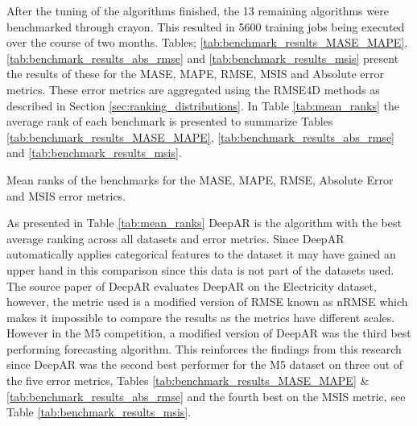 After the tuning of the algorithms finished,  the 13 remaining algorithms were benchmarked through crayon. This resulted in 5600 training jobs being executed over the course of two months. Tables; \ref{tab:benchmark_results_MASE_MAPE}, \ref{tab:benchmark_results_abs_rmse} and \ref{tab:benchmark_results_msis} present the results of these for the MASE, MAPE, RMSE, MSIS and Absolute error metrics. These error metrics are aggregated using the RMSE4D methods as described in Section \ref{sec:ranking_distributions}. In Table \ref{tab:mean_ranks} the average rank of each benchmark is presented to summarize Tables \ref{tab:benchmark_results_MASE_MAPE}, \ref{tab:benchmark_results_abs_rmse} and \ref{tab:benchmark_results_msis}.

\begin{table}[h]
  \centering
  \caption{Mean ranks of the benchmarks for the MASE, MAPE, RMSE, Absolute Error and MSIS error metrics.}
  \label{tab:mean_ranks}
\end{table}

As presented in Table \ref{tab:mean_ranks} DeepAR is the algorithm with the best average ranking across all datasets and error metrics. Since DeepAR automatically applies categorical features to the dataset it may have gained an upper hand in this comparison since this data is not part of the datasets used. The source paper of DeepAR evaluates DeepAR on the Electricity dataset, however, the metric used is a modified version of RMSE known as nRMSE which makes it impossible to compare the results as the metrics have different scales. However in the M5 competition, a modified version of DeepAR was the third best performing forecasting algorithm. This reinforces the findings from this research since DeepAR was the second best performer for the M5 dataset on three out of the five error metrics, Tables \ref{tab:benchmark_results_MASE_MAPE} \& \ref{tab:benchmark_results_abs_rmse} and the fourth best on the MSIS metric, see Table \ref{tab:benchmark_results_msis}.

